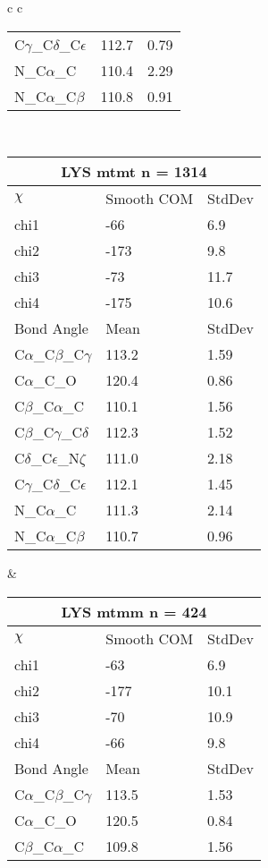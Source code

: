 \begin{longtable}{ c c }
\begin{tabular}{ l l l }
  C$\gamma$\_C$\delta$\_C$\epsilon$ & 112.7 & 0.79\\
  N\_C$\alpha$\_C & 110.4 & 2.29\\
  N\_C$\alpha$\_C$\beta$ & 110.8 & 0.91\\
  \bottomrule
  \end{tabular}
  \\
  \begin{tabular}{ l l l }
  \toprule
  \multicolumn{3}{c}{LYS \textbf{mtmt} n = 1314} \\ \toprule
  $\chi$       & Smooth COM & StdDev \\ \midrule
  chi1 & -66 & 6.9 \\ 
  chi2 & -173 & 9.8 \\ 
  chi3 & -73 & 11.7 \\ 
  chi4 & -175 & 10.6 \\ \midrule
  Bond Angle   & Mean     & StdDev \\ \midrule
  C$\alpha$\_C$\beta$\_C$\gamma$ & 113.2 & 1.59\\
  C$\alpha$\_C\_O & 120.4 & 0.86\\
  C$\beta$\_C$\alpha$\_C & 110.1 & 1.56\\
  C$\beta$\_C$\gamma$\_C$\delta$ & 112.3 & 1.52\\
  C$\delta$\_C$\epsilon$\_N$\zeta$ & 111.0 & 2.18\\
  C$\gamma$\_C$\delta$\_C$\epsilon$ & 112.1 & 1.45\\
  N\_C$\alpha$\_C & 111.3 & 2.14\\
  N\_C$\alpha$\_C$\beta$ & 110.7 & 0.96\\
  \bottomrule
  \end{tabular}
  &
  \begin{tabular}{ l l l }
  \toprule
  \multicolumn{3}{c}{LYS \textbf{mtmm} n = 424} \\ \toprule
  $\chi$       & Smooth COM & StdDev \\ \midrule
  chi1 & -63 & 6.9 \\ 
  chi2 & -177 & 10.1 \\ 
  chi3 & -70 & 10.9 \\ 
  chi4 & -66 & 9.8 \\ \midrule
  Bond Angle   & Mean     & StdDev \\ \midrule
  C$\alpha$\_C$\beta$\_C$\gamma$ & 113.5 & 1.53\\
  C$\alpha$\_C\_O & 120.5 & 0.84\\
  C$\beta$\_C$\alpha$\_C & 109.8 & 1.56\\

\end{tabular}
\end{longtable}
